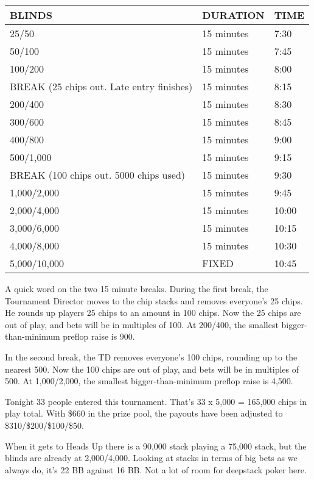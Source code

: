 \begin{tabular}{|l|l|l|} \hline
BLINDS  &  DURATION   & TIME \\ \hline
25/50   &  15 minutes & 7:30 \\ \hline
50/100  &  15 minutes & 7:45 \\ \hline
100/200 &  15 minutes & 8:00 \\ \hline
BREAK (25 chips out. Late entry finishes)  &  15 minutes & 8:15 \\ \hline
200/400 &  15 minutes & 8:30 \\ \hline
300/600 &  15 minutes & 8:45 \\ \hline
400/800 &  15 minutes & 9:00 \\ \hline
500/1,000 & 15 minutes & 9:15 \\ \hline
BREAK (100 chips out. 5000 chips used)   &  15 minutes  & 9:30 \\ \hline
1,000/2,000 & 15 minutes & 9:45 \\ \hline
2,000/4,000 & 15 minutes & 10:00 \\ \hline
3,000/6,000 & 15 minutes & 10:15 \\ \hline
4,000/8,000 & 15 minutes & 10:30 \\ \hline
5,000/10,000 & FIXED & 10:45 \\ \hline
\end{tabular}

\newpage
A quick word on the two 15 minute breaks. During the first break,
the Tournament Director moves to the chip stacks and removes
everyone's 25 chips. He rounds up players 25 chips to an amount
in 100 chips. Now the 25 chips are out of play, and bets will be
in multiples of 100. At 200/400, the smallest bigger-than-minimum
preflop raise is 900.

In the second break, the TD removes everyone's 100 chips, rounding up
to the nearest 500. Now the 100 chips are out of play, and bets
will be in multiples of 500. At 1,000/2,000, the smallest
bigger-than-minimum preflop raise is 4,500.

Tonight 33 people entered this tournament. That's 33 x 5,000 = 165,000
chips in play total. With \$660 in the prize pool, the payouts have been
adjusted to \$310/\$200/\$100/\$50.

When it gets to Heads Up there is a 90,000 stack
playing a 75,000 stack, but the blinds are already at 2,000/4,000.
Looking at stacks in terms of big bets as we always do,
it's 22 BB against 16 BB. Not a lot of room for deepstack
poker here.

